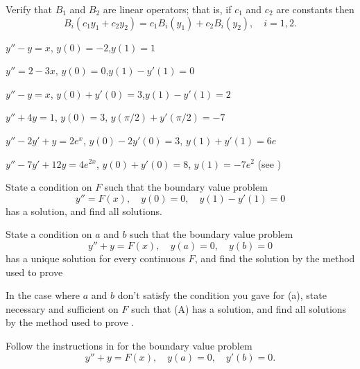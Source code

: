 \begin{exerciselist}

\item\label{exer:13.1.1}Verify that $B_{1}$ and $B_{2}$ are linear operators; that is, if $c_{1}$
and $c_{2}$  are constants then
\[
B_{i}(c_{1}y_{1}+c_{2}y_{2})=c_{1}B_{i}(y_{1})+c_{2}B_{i}(y_{2}),\quad
i=1,2.
\]


\item\label{exer:13.1.2}$y''-y=x$, \quad  $y(0)=-2$,\quad  $y(1)=1$


\item\label{exer:13.1.3}$y''=2-3x$, \quad  $y(0)=0$,\quad  $y(1)-y'(1)=0$

\item\label{exer:13.1.4}$y''-y=x$, \quad  $y(0)+y'(0)=3$,\quad  $y(1)-y'(1)=2$

\item\label{exer:13.1.5}$y''+4y=1$, \quad  $y(0)=3$,\quad
 $y(\pi/2)+y'(\pi/2)=-7$

\item\label{exer:13.1.6}$y''-2y'+y=2e^{x}$, \quad  $y(0)-2y'(0)=3$,\quad
 $y(1)+y'(1)=6e$

\item\label{exer:13.1.7}$y''-7y'+12y=4e^{2x}$, \quad  $y(0)+y'(0)=8$,\quad
 $y(1)=-7e^{2}$ (see )

\item\label{exer:13.1.8}State a condition on $F$ such that the boundary
value problem
\[
y''=F(x), \quad  y(0)=0, \quad y(1)-y'(1)=0
\]
has a  solution, and find all solutions.

\item\label{exer:13.1.9}\begin{alist}
\item %
State  a condition on $a$ and $b$ such that the boundary
value problem
\[
y''+y=F(x),\quad y(a)=0,\quad y(b)=0     \tag{A}
\]
has a unique solution for every continuous $F$, and find the solution
by the method used to prove 
\item %
In the case where $a$ and $b$ don't satisfy the condition you gave for
(a), state necessary and sufficient     on $F$ such that (A) has
a solution, and find all solutions by the method used to prove
.
\end{alist}

\item\label{exer:13.1.10}Follow the instructions in  for the boundary value
problem
\[
y''+y=F(x),\quad y(a)=0,\quad y'(b)=0.
\]


\end{exerciselist}
